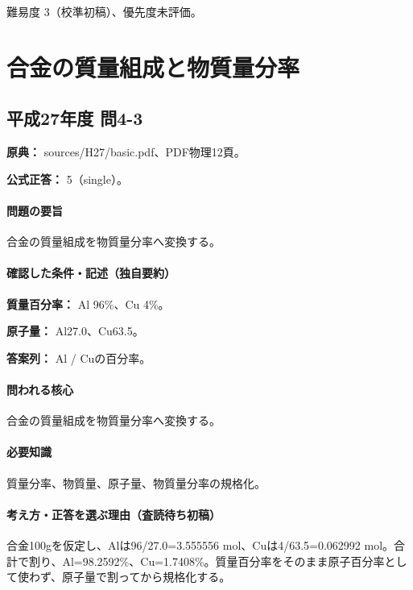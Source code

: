 \par 難易度 3（校準初稿）、優先度未評価。

\section{合金の質量組成と物質量分率}

\subsection{平成27年度 問4-3}
\label{q:h27-reg-basic-4-3}

\noindent\textbf{原典：} sources/H27/basic.pdf、PDF物理12頁。

\textbf{公式正答：} 5（single）。

\paragraph{問題の要旨} 合金の質量組成を物質量分率へ変換する。

\paragraph{確認した条件・記述（独自要約）}\mbox{}\par

\noindent\textbf{質量百分率：} Al 96\%、Cu 4\%。\par

\noindent\textbf{原子量：} Al27.0、Cu63.5。\par

\noindent\textbf{答案列：} Al / Cuの百分率。\par

\paragraph{問われる核心} 合金の質量組成を物質量分率へ変換する。

\paragraph{必要知識} 質量分率、物質量、原子量、物質量分率の規格化。

\paragraph{考え方・正答を選ぶ理由（査読待ち初稿）} 合金100gを仮定し、Alは96/27.0=\allowbreak{}3.555556 mol、Cuは4/63.5=\allowbreak{}0.062992 mol。合計で割り、Al=\allowbreak{}98.2592\%、Cu=\allowbreak{}1.7408\%。質量百分率をそのまま原子百分率として使わず、原子量で割ってから規格化する。

